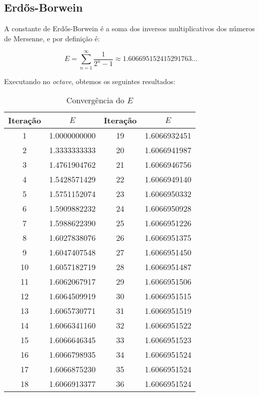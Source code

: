 \subsection{Erdős-Borwein}

A constante de Erdős-Borwein é a soma dos inversos multiplicativos dos números
de Mersenne, e por definição é:

\begin{equation}
	E = \displaystyle\sum_{n=1}^{\infty} \frac{1}{2^n-1} \approx 1.606695152415291763\dots
\end{equation}

Executando no \emph{octave}, obtemos os seguintes resultados:

\begin{table}[H]
	\centering
	\begin{tabular}{|c|c|c|c|}
    	\hline
		Iteração & $E$ & Iteração & $E$ \\
    	\hline
		1 & 1.0000000000 & 19 & 1.6066932451 \\
    	\hline
		2 & 1.3333333333 & 20 & 1.6066941987 \\
    	\hline
		3 & 1.4761904762 & 21 & 1.6066946756 \\
    	\hline
		4 & 1.5428571429 & 22 & 1.6066949140 \\
    	\hline
		5 & 1.5751152074 & 23 & 1.6066950332 \\
    	\hline
		6 & 1.5909882232 & 24 & 1.6066950928 \\
    	\hline
		7 & 1.5988622390 & 25 & 1.6066951226 \\
    	\hline
		8 & 1.6027838076 & 26 & 1.6066951375 \\
    	\hline
		9 & 1.6047407548 & 27 & 1.6066951450 \\
    	\hline
		10 & 1.6057182719 & 28 & 1.6066951487 \\
    	\hline
		11 & 1.6062067917 & 29 & 1.6066951506 \\
    	\hline
		12 & 1.6064509919 & 30 & 1.6066951515 \\
    	\hline
		13 & 1.6065730771 & 31 & 1.6066951519 \\
    	\hline
		14 & 1.6066341160 & 32 & 1.6066951522 \\
    	\hline
		15 & 1.6066646345 & 33 & 1.6066951523 \\
    	\hline
		16 & 1.6066798935 & 34 & 1.6066951524 \\
    	\hline
		17 & 1.6066875230 & 35 & 1.6066951524 \\
    	\hline
		18 & 1.6066913377 & 36 & 1.6066951524 \\
    	\hline
	\end{tabular}
	\label{erdos_table}
	\caption{Convergência do $E$}
\end{table}

